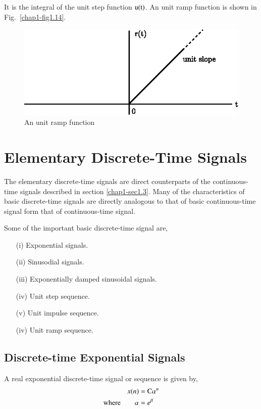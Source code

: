 It is the integral of the unit step function $\textrm{u}(\textrm{t})$. An unit ramp function is shown in Fig.~\ref{chap1-fig1.14}.
\begin{figure}[H]
\centering
\includegraphics{src/chap1/fig.1.14.eps}
\caption{An unit ramp function}\label{chap1-fig-1.14}
\end{figure}

\section{Elementary Discrete-Time Signals}\label{chap1-sec1.4}
The elementary discrete-time signals are direct counterparts of the continuous-time signals described in section
\ref{chap1-sec1.3}. Many of the characteristics of basic discrete-time signals are directly analogous to that of basic continuous-time signal form that of continuous-time signal. 

Some of the important basic discrete-time signal are,
\begin{itemize}
\item[(i)] Exponential signals.

\item[(ii)] Sinusodial signals.
 
\item[(iii)] Exponentially damped sinusoidal signals.

\item[(iv)] Unit step sequence.
 
\item[(v)] Unit impulse sequence.

\item[(iv)] Unit ramp sequence. 
\end{itemize}

\subsection{Discrete-time Exponential Signals}\label{chap1-subsec-1.4.1}
A real exponential discrete-time signal or sequence is given by,
\begin{align}
x(n) &= \textrm{C} \alpha^{n}\label{chap1-eq-1.13}\\
\text{where}\qquad \alpha &= e^{\beta}\label{chap1-eq-1.14}
\end{align}

